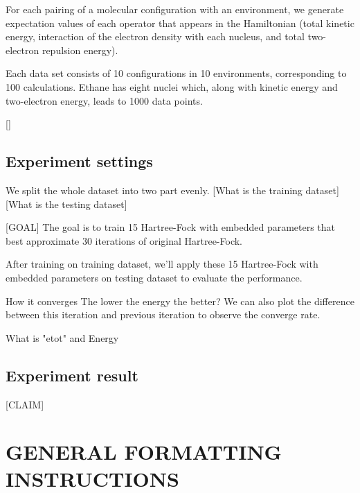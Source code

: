\documentclass[twoside]{article}
\begin{document}
For each pairing of a molecular configuration with an environment, we generate expectation values of each operator that appears in the Hamiltonian (total kinetic energy, interaction of the electron density with each nucleus, and total two-electron repulsion energy).


Each data set consists of 10 configurations in 10 environments, corresponding to 100 calculations. Ethane has eight nuclei which, along with kinetic energy and two-electron energy, leads to 1000 data points. 

[]




\subsection{Experiment settings}



We split the whole dataset into two part evenly. 
[What is the training dataset]
[What is the testing dataset]

[GOAL]
The goal is to train 15 Hartree-Fock with embedded parameters that best approximate 30 iterations of original Hartree-Fock.

After training on training dataset, we'll apply these 15 Hartree-Fock with embedded parameters on testing dataset to evaluate the performance.

How  it converges
The lower the energy the better?
We can also plot the difference between this iteration and previous iteration to observe the converge rate.

What is "etot"  and Energy\\

\subsection{Experiment result}
[CLAIM]


\section{GENERAL FORMATTING INSTRUCTIONS}
\end{document}
